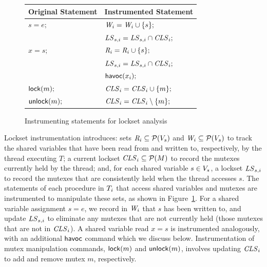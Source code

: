\begin{figure}
\footnotesize
\center
\begin{tabular}{ll}
\textbf{Original Statement} & \textbf{Instrumented Statement} \\
\toprule

$s = e;$ & $\mathit{W}_{i} = \mathit{W}_{i} \cup \{ s \};$ \\
         & $\mathit{LS}_{s,i} = \mathit{LS}_{s,i} \cap \mathit{CLS}_{i};$ \\
\midrule
         
$x = s;$ & $\mathit{R}_{i} = \mathit{R}_{i} \cup \{ s \};$ \\
         & $\mathit{LS}_{s,i} = \mathit{LS}_{s,i} \cap \mathit{CLS}_{i};$ \\
         & $\mathsf{havoc}({x_{i}});$ \\
\midrule
         
$\mathsf{lock}(m);$   & $\mathit{CLS}_{i} = \mathit{CLS}_{i} \cup \{ m \};$ \\
\midrule

$\mathsf{unlock}(m);$ & $\mathit{CLS}_{i} = \mathit{CLS}_{i} \setminus \{ m \};$ \\
\bottomrule
\end{tabular}
\caption{Instrumenting statements for lockset analysis}
\label{fig:instrumentation}
\end{figure}

Lockset instrumentation introduces: sets $\mathit{R}_{i} \subseteq \mathcal{P}(V_s)$ and $\mathit{W}_{i} \subseteq \mathcal{P}(V_s)$ to track the shared variables that have been read from and written to, respectively, by the thread executing $T$; a current lockset $\mathit{CLS}_{i} \subseteq \mathcal{P}(M)$ to record the mutexes currently held by the thread; and, for each shared variable $s \in V_s$, a lockset $\mathit{LS}_{s,i}$ to record the mutexes that are consistently held when the thread accesses $s$.
%
The statements of each procedure in $T_{i}$ that access shared variables and mutexes are instrumented to manipulate these sets, as shown in Figure~\ref{fig:instrumentation}.  For a shared variable assignment $s = e$, we record in $\mathit{W}_{i}$ that $s$ has been written to, and update $\mathit{LS}_{s,i}$ to eliminate any mutexes that are not currently held (those mutexes that are not in $\mathit{CLS}_{i}$).  A shared variable read $x = s$ is instrumented analogously, with an additional $\mathsf{havoc}$ command which we discuss below.  Instrumentation of mutex manipulation commands, $\mathsf{lock}(m)$ and $\mathsf{unlock}(m)$, involves updating $\mathit{CLS}_{i}$ to add and remove mutex $m$, respectively.

